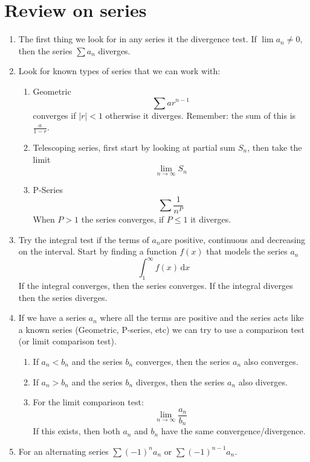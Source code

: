 \documentclass{article}
\begin{document}
\section{Review on series}
    \begin{enumerate}
        \item The first thing we look for in any series it the divergence test. If \(\lim a_n \neq 0\), then the series \(\sum a_n\) diverges.
        \item Look for known types of series that we can work with:
        \begin{enumerate}
            \item Geometric \[\sum ar^{n-1}\]
            converges if \(|r| < 1\) otherwise it diverges. Remember: the sum of this is \(\frac{a}{1-r}\).
            \item Telescoping series, first start by looking at partial sum \(S_n\), then take the limit
            \[\lim_{n \to \infty} S_n\]
            \item P-Series \[\sum \frac{1}{n^P}\]
            When \(P > 1\) the series converges, if \(P \leq 1\) it diverges.
        \end{enumerate}
        \item Try the integral test if the terms of \(a_n\)are positive, continuous and decreasing on the interval.
        Start by finding a function \(f(x)\) that models the series \(a_n\)
        \[\int_{1}^{\infty} f(x) \,\mathrm{d}x \]
        If the integral converges, then the series converges. If the integral diverges then the series diverges.
        \item If we have a series \(a_n\) where all the terms are positive and the series acts like a known series (Geometric, P-series, etc)
        we can try to use a comparison test (or limit comparison test).
        \begin{enumerate}
            \item If \(a_n < b_n\) and the series \(b_n\) converges, then the series \(a_n\) also converges.
            \item If \(a_n > b_n\) and the series \(b_n\) diverges, then the series \(a_n\) also diverges.
            \item For the limit comparison test:
            \[\lim_{n \to \infty} \frac{a_n}{b_n}\]
            If this exists, then both \(a_n\) and \(b_n\) have the same convergence/divergence.
        \end{enumerate}
        \item For an alternating series \(\sum (-1)^n a_n\) or \(\sum (-1)^{n-1} a_n\).

\end{enumerate}
\end{document}
